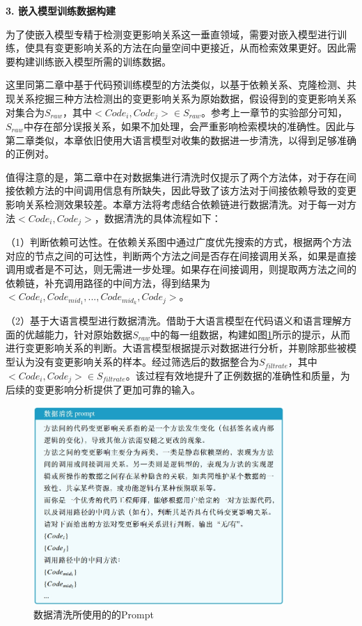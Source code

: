\noindent \textbf{3. 嵌入模型训练数据构建}

为了使嵌入模型专精于检测变更影响关系这一垂直领域，需要对嵌入模型进行训练，使具有变更影响关系的方法在向量空间中更接近，从而检索效果更好。因此需要构建训练嵌入模型所需的训练数据。

这里同第二章中基于代码预训练模型的方法类似，以基于依赖关系、克隆检测、共现关系挖掘三种方法检测出的变更影响关系为原始数据，假设得到的变更影响关系对集合为$S_{raw}$，其中$<Code_i,Code_j>\in S_{raw}$。参考上一章节的实验部分可知，$S_{raw}$中存在部分误报关系，如果不加处理，会严重影响检索模块的准确性。因此与第二章类似，本章依旧使用大语言模型对收集的数据进一步清洗，以得到足够准确的正例对。

值得注意的是，第二章中在对数据集进行清洗时仅提示了两个方法体，对于存在间接依赖方法的中间调用信息有所缺失，因此导致了该方法对于间接依赖导致的变更影响关系检测效果较差。本章方法将考虑结合依赖链进行数据清洗。对于每一对方法$<Code_i,Code_j>$，数据清洗的具体流程如下：

（1）判断依赖可达性。在依赖关系图中通过广度优先搜索的方式，根据两个方法对应的节点之间的可达性，判断两个方法之间是否存在间接调用关系，如果是直接调用或者是不可达，则无需进一步处理。如果存在间接调用，则提取两方法之间的依赖链，补充调用路径的中间方法，得到结果为$<Code_i,Code_{mid_1},...,Code_{mid_k},Code_j>$。

（2）基于大语言模型进行数据清洗。借助于大语言模型在代码语义和语言理解方面的优越能力，针对原始数据$S_{raw}$中的每一组数据，构建如图\ref{2_数据清洗prompt}所示的提示，从而进行变更影响关系的判断。大语言模型根据提示对数据进行分析，并剔除那些被模型认为没有变更影响关系的样本。经过筛选后的数据整合为$S_{filtrate}$，其中$<Code_i,Code_j>\in S_{filtrate}$。该过程有效地提升了正例数据的准确性和质量，为后续的变更影响分析提供了更加可靠的输入。

\begin{figure}[htbp]
\centering
\includegraphics[width = 0.85\textwidth]{figures/2_数据清洗prompt.png}
\caption{数据清洗所使用的的Prompt}
\label{2_数据清洗prompt}
\end{figure}

